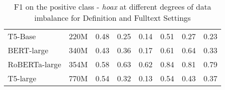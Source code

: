\begin{table*}[]
{\begin{tabular}{lccccccc}
T5-Base                       & 220M                                    & 0.48                                       & 0.25                                        & \multicolumn{1}{c}{0.14}                     & 0.51                                       & 0.27                                        & 0.23                                         \\
BERT-large                    & 340M                                    & 0.43                                       & 0.36                                        & \multicolumn{1}{c}{0.17}                     & 0.61                                       & 0.64                                        & 0.33                                         \\
RoBERTa-large                 & 354M                                    & 0.58                                       & 0.63                                        & \multicolumn{1}{c}{0.62}                     & 0.84                                       & 0.81                                        & 0.79                                         \\
T5-large                      & 770M                                    & 0.54                                       & 0.32                                        & \multicolumn{1}{c}{0.13}                     & 0.54                                       & 0.43                                        & 0.37                                         \\ \hline
\end{tabular}}
\caption{F1 on the positive class - \textit{hoax} at different degrees of data imbalance for Definition and Fulltext Settings}
\label{tab:all_setting_comparison}
\end{table*}


